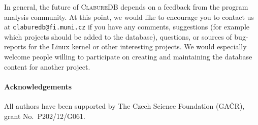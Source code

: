 \documentclass[10pt]{llncs}
\newcommand\Color[2]{\textcolor{#1}{#2}}
\newcommand{\nb}[1]{\marginpar{\scriptsize #1}}
\newcommand\todo[1]{\nb{\Color{red}{#1}}}
\newcommand\cdb{\textsc{ClabureDB}\xspace}
\begin{document}
In general, the future of \cdb depends on a feedback from the program analysis
community. At this point, we would like to encourage you to contact us at
\texttt{claburedb@fi.muni.cz} if you have any comments, suggestions (for
example which projects should be added to the database), questions, or
sources of bug-reports for the Linux kernel or other interesting projects. We
would especially welcome people willing to participate on creating and
maintaining the database content for another project.

\paragraph{Acknowledgements}
\label{sec:acknowledgements}

All authors have been supported by The Czech Science Foundation (GA\v{C}R),
grant No.~P202/12/G061.





\end{document}
